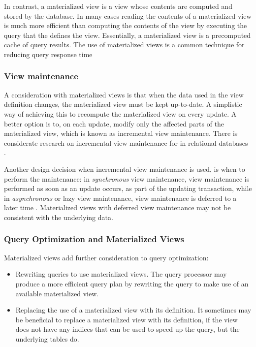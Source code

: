 In contrast, a materialized view is a view whose contents are computed and stored by the database.
In many cases reading the contents of a materialized view is much more efficient than computing the contents of the view
by executing the query that the defines the view.
Essentially, a materialized view is a precomputed cache of query results.
The use of materialized views is a common technique for reducing query response time


\subsubsection{View maintenance}

A consideration with materialized views is that when the data used in the view definition changes, the materialized view
must be kept up-to-date.
A simplistic way of achieving this to recompute the materialized view on every update.
A better option is to, on each update, modify only the affected parts of the materialized view,
which is known as incremental view maintenance.
There is considerate research on incremental view maintenance for in relational databases
\cite{larson:outerjoinviewmaintenance, lee:multiplejoinviewmaintenance, zhuge:viewmaintenance}.

Another design decision when incremental view maintenance is used, is when to perform the maintenance:
in \textit{synchronous} view maintenance, view maintenance is performed as soon as an update occurs,
as part of the updating transaction,
while in \textit{asynchronous} or lazy view maintenance,
view maintenance is deferred to a later time \cite{zhou:lazymvMaintenance}.
Materialized views with deferred view maintenance may not be consistent with the underlying data.

\subsubsection{Query Optimization and Materialized Views}

Materialized views add further consideration to query optimization:

\begin{itemize}

  \item Rewriting queries to use materialized views.
  The query processor may produce a more efficient query plan by rewriting the query to make use of an available
  materialized view.

  \item Replacing the use of a materialized view with its definition.
  It sometimes may be beneficial to replace a materialized view with its definition, if the view does not have any
  indices that can be used to speed up the query, but the underlying tables do.

\end{itemize}

